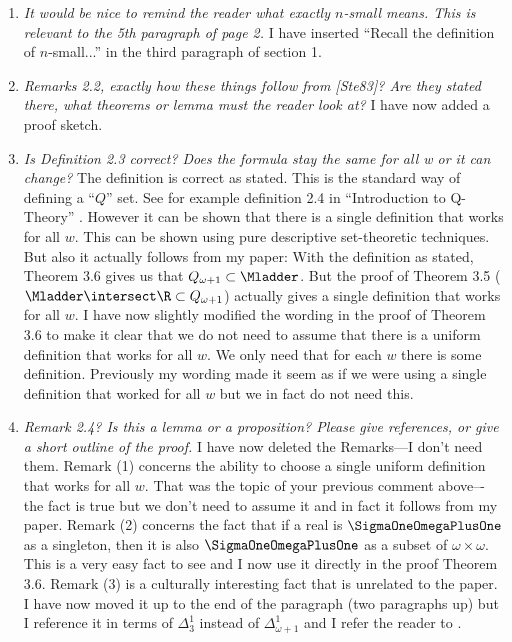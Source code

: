 \documentclass[oneside,12pt]{amsart}
\begin{document}
\begin{enumerate} [label=\arabic*)]
\item \emph{It would be nice to remind the reader what exactly $n$-small means. This is relevant to the 5th paragraph of page 2.}
 I have inserted ``Recall the definition of $n$-small...''  in the third paragraph of section 1.
 
 \item  \emph{Remarks 2.2, exactly how these things follow from [Ste83]? Are they stated there, what theorems or lemma must the reader look at?}
 I have now added a proof sketch.
 
 \item \emph{Is Definition 2.3 correct? Does the formula stay the same for all w or it can change?}
 The definition is correct as stated. This is the standard way of defining a “$Q$” set. See for example definition 2.4 in “Introduction to Q-Theory” \cite{Q_Theory}. However it can be shown that there is a single definition that works for all $w$. 
 This can be shown using pure descriptive set-theoretic techniques. But also it actually follows from my paper: With the definition as stated, Theorem 3.6 gives us that  $Q_{\omega+1}\subset \Mladder$. But the proof of Theorem 3.5  ($\Mladder\intersect \R \subset Q_{\omega+1}$) actually gives a single definition that works for all $w$. I have now slightly modified the wording in the proof of Theorem 3.6 to make it clear that we do not need to assume that there is a uniform definition that works for all $w$. We only need that for each $w$ there is some definition. Previously my wording made it seem as if we were using a single definition that worked for all $w$ but we in fact do not need this.
 
 \item \emph{Remark 2.4? Is this a lemma or a proposition? Please give references, or give a short outline of the proof.} I have now deleted the Remarks---I don’t need them. Remark (1) concerns the ability to choose a  single uniform definition that works for all 
 $w$. That was the topic of your previous comment above–-the fact is true but we don’t need to assume it and in fact it follows from my paper. Remark (2) concerns the fact that if a real is $\SigmaOneOmegaPlusOne$ as a singleton, then it is also 
 $\SigmaOneOmegaPlusOne$ as a subset of $\omega \times \omega$. This is a very easy fact to see and I now use it directly in the proof Theorem 3.6. Remark (3) is a culturally interesting fact that is unrelated to the paper. I have now moved it up to the end of the paragraph (two paragraphs up) but I reference it in terms of $\Delta^1_3$ instead of $\Delta^1_{\omega+1}$ and I refer the reader to \cite{Q_Theory}.
 

\end{enumerate}
\end{document}
